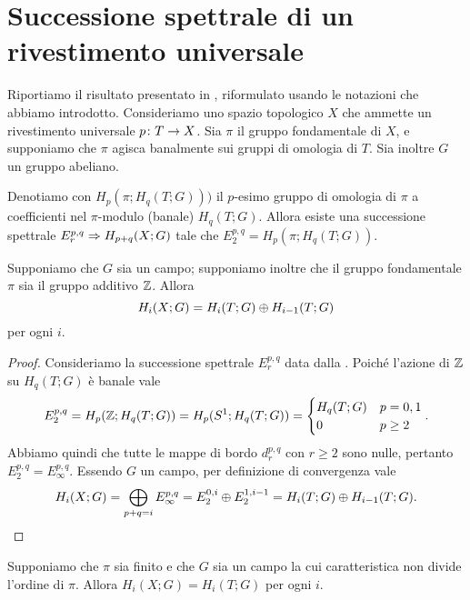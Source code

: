 \section{Successione spettrale di un rivestimento universale}
Riportiamo il risultato presentato in , riformulato usando le notazioni che abbiamo introdotto. Consideriamo uno spazio topologico $X$ che ammette un rivestimento universale $p\colon T\to X$. Sia $\pi$ il gruppo fondamentale di $X$, e supponiamo che $\pi$ agisca banalmente sui gruppi di omologia di $T$. Sia inoltre $G$ un gruppo abeliano.
\begin{proposition}
Denotiamo con $H_p(\pi;H_q(T;G)))$ il $p$-esimo gruppo di omologia di $\pi$ a coefficienti nel $\pi$-modulo (banale) $H_q(T;G)$. Allora esiste una successione spettrale $E^{p,q}_r\Rightarrow H_{p+q}(X;G)$ tale che $E^{p,q}_2=H_p(\pi;H_q(T;G))$.
\end{proposition}
\begin{corollary}
Supponiamo che $G$ sia un campo; supponiamo inoltre che il gruppo fondamentale $\pi$ sia il gruppo additivo $\mathbb{Z}$. Allora
$$
H_i(X;G)=H_i(T;G)\mathbin{\oplus} H_{i-1}(T;G)
$$
per ogni $i$.
\end{corollary}
\begin{proof}
Consideriamo la successione spettrale $E^{p,q}_r$ data dalla . Poiché l'azione di $\mathbb{Z}$ su $H_q(T;G)$ è banale vale
$$
E^{p,q}_2=H_p(\mathbb{Z};H_q(T;G))=H_p(S^1;H_q(T;G))=
\begin{cases}
H_q(T;G)&p=0,1\\
0&p\ge 2
\end{cases}.
$$
Abbiamo quindi che tutte le mappe di bordo $d^{p,q}_r$ con $r\ge 2$ sono nulle, pertanto $E^{p,q}_2=E^{p,q}_\infty$. Essendo $G$ un campo, per definizione di convergenza vale
$$
H_i(X;G)=\bigoplus_{p+q=i}E^{p,q}_\infty=E^{0,i}_2\mathbin{\oplus} E^{1,i-1}_2=H_i(T;G)\mathbin{\oplus} H_{i-1}(T;G).
$$
\end{proof}
\begin{corollary}
Supponiamo che $\pi$ sia finito e che $G$ sia un campo la cui caratteristica non divide l'ordine di $\pi$. Allora $H_i(X;G)=H_i(T;G)$ per ogni $i$.
\end{corollary}
